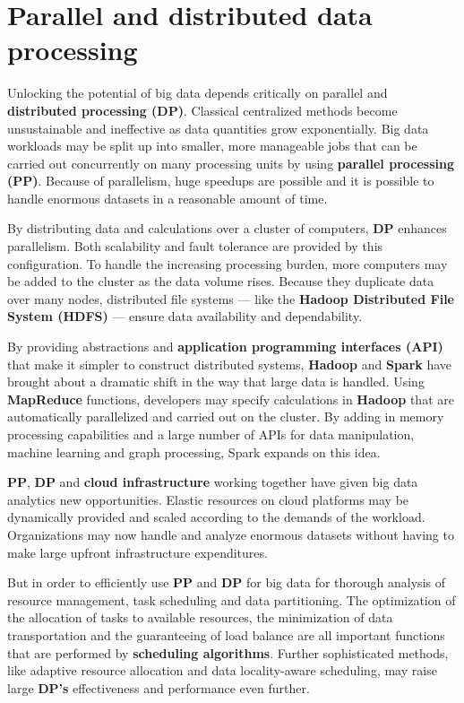 \chapter{Parallel and distributed data processing}

Unlocking the potential of big data depends critically on parallel and \textbf{distributed processing (DP)}. Classical centralized methods become unsustainable and ineffective as data quantities grow exponentially. Big data workloads may be split up into smaller, more manageable jobs that can be carried out concurrently on many processing units by using \textbf{parallel processing (PP)}. Because of parallelism, huge speedups are possible and it is possible to handle enormous datasets in a reasonable amount of time. 

By distributing data and calculations over a cluster of computers, \textbf{DP} enhances parallelism. Both scalability and fault tolerance are provided by this configuration. To handle the increasing processing burden, more computers may be added to the cluster as the data volume rises. Because they duplicate data over many nodes, distributed file systems — like the \textbf{Hadoop Distributed File System (HDFS)} — ensure data availability and dependability.

By providing abstractions and \textbf{application programming interfaces (API)} that make it simpler to construct distributed systems, \textbf{Hadoop} and \textbf{Spark} have brought about a dramatic shift in the way that large data is handled. Using \textbf{MapReduce} functions, developers may specify calculations in \textbf{Hadoop} that are automatically parallelized and carried out on the cluster. By adding in memory processing capabilities and a large number of APIs for data manipulation, machine learning and graph processing, Spark expands on this idea.

\textbf{PP}, \textbf{DP} and \textbf{cloud infrastructure} working together have given big data analytics new opportunities. Elastic resources on cloud platforms may be dynamically provided and scaled according to the demands of the workload. Organizations may now handle and analyze enormous datasets without having to make large upfront infrastructure expenditures.

But in order to efficiently use \textbf{PP} and \textbf{DP} for big data for thorough analysis of resource management, task scheduling and data partitioning. The optimization of the allocation of tasks to available resources, the minimization of data transportation and the guaranteeing of load balance are all important functions that are performed by \textbf{scheduling algorithms}. Further sophisticated methods, like adaptive resource allocation and data locality-aware scheduling, may raise large \textbf{DP's} effectiveness and performance even further.


